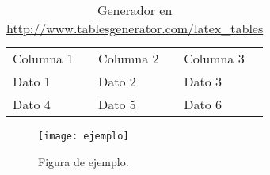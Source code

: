 \begin{table}[]
  \caption{Generador en \url{http://www.tablesgenerator.com/latex_tables}}
  \centering
  \label{cuadro}
  \begin{tabular}{lll}
  Columna 1 & Columna 2 & Columna 3 \\
  Dato 1    & Dato 2    & Dato 3    \\
  Dato 4    & Dato 5    & Dato 6   
  \end{tabular}
\end{table}

\begin{figure}
  \caption{Figura de ejemplo.}
  \centering
  \label{figura}
  \texttt{[image: ejemplo]}
\end{figure}
